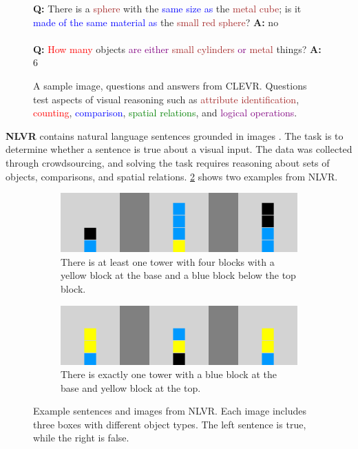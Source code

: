 \begin{figure}[ht]
\begin{minipage}{0.49\textwidth}
    \textbf{Q:} There is a \textcolor{brown}{sphere} with the \textcolor{blue}{same size as}
    the \textcolor{brown}{metal cube}; is it
    \textcolor{blue}{made of the same material as} the \textcolor{brown}{small red sphere}? \textbf{A:} no \\\\
    \textbf{Q:} \textcolor{red}{How many} objects \textcolor{purple}{are either}
    \textcolor{brown}{small cylinders}
    \textcolor{purple}{or} \textcolor{brown}{metal} things? \textbf{A:} 6
  \end{minipage}
  \vspace{1mm}
  \caption{A sample image, questions and answers from CLEVR. Questions test aspects of visual reasoning
    such as \textcolor{brown}{attribute identification}, \textcolor{red}{counting},
    \textcolor{blue}{comparison}, \textcolor{green}{spatial relations},
    and \textcolor{purple}{logical operations}.
  }
  \vspace{-4mm}
  \label{fig:clevr_example}
\end{figure}

\textbf{NLVR} contains natural language sentences grounded in images \cite{suhr-etal-2017-corpus}. The task is to determine whether a sentence is true about a visual input. The data was collected through crowdsourcing, and solving the task requires reasoning about sets of objects, comparisons, and spatial relations. \cref{fig:nlvr_examples} shows two examples from NLVR.

\begin{figure}[ht]
  \centering
    \centering
    \begin{subfigure}[b]{0.49\linewidth}
    \centering
    \includegraphics[width=\linewidth]{images/datasets/nlvr_ex_0.png}
    \caption{There is at least one tower with four blocks with a yellow block at the base and a blue block below the top block.}
     \end{subfigure}
     \hfill
     \begin{subfigure}[b]{0.49\linewidth}
     \centering
    \includegraphics[width=\linewidth]{images/datasets/nlvr_ex_1.png}
    \caption{There is exactly one tower with a blue block at the base and yellow block at the top.}
     \end{subfigure}
    \caption{Example sentences and images from NLVR. Each image includes three boxes with different object types. The left sentence is true, while the right is false.}
    \label{fig:nlvr_examples}
\end{figure}

